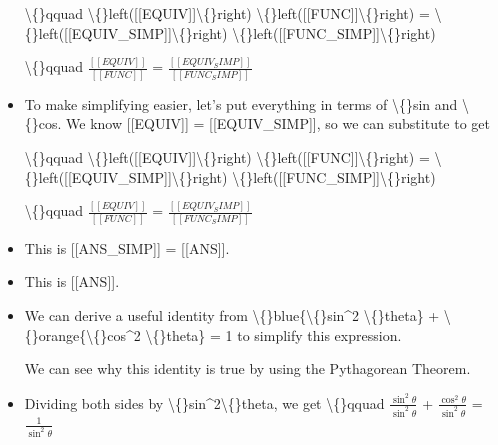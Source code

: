 \documentclass{article}
\begin{document}
\begin{itemize}
                        \textbackslash\{\}qquad 
                            \textbackslash\{\}left([[EQUIV]]\textbackslash\{\}right)
                            \textbackslash\{\}left([[FUNC]]\textbackslash\{\}right) 
                            =
                            \textbackslash\{\}left([[EQUIV\_SIMP]]\textbackslash\{\}right)
                            \textbackslash\{\}left([[FUNC\_SIMP]]\textbackslash\{\}right) 
                        
                    
                    
                        \textbackslash\{\}qquad
                            $\frac{[[EQUIV]]}{[[FUNC]]}$
                            =
                            $\frac{[[EQUIV_SIMP]]}{[[FUNC_SIMP]]}$
  \item To make simplifying easier, let's put everything
                    in terms of \textbackslash\{\}sin and \textbackslash\{\}cos.
                    We know [[EQUIV]] 
                        = [[EQUIV\_SIMP]], so we can substitute
                    to get
                    
                        \textbackslash\{\}qquad
                            \textbackslash\{\}left([[EQUIV]]\textbackslash\{\}right)
                            \textbackslash\{\}left([[FUNC]]\textbackslash\{\}right) 
                            =
                            \textbackslash\{\}left([[EQUIV\_SIMP]]\textbackslash\{\}right)
                            \textbackslash\{\}left([[FUNC\_SIMP]]\textbackslash\{\}right) 
                        
                    
                    
                        \textbackslash\{\}qquad
                            $\frac{[[EQUIV]]}{[[FUNC]]}$
                            =
                            $\frac{[[EQUIV_SIMP]]}{[[FUNC_SIMP]]}$
  \item This is [[ANS\_SIMP]] = [[ANS]].
  \item This is [[ANS]].
  \item We can derive a useful identity from 
                    \textbackslash\{\}blue\{\textbackslash\{\}sin\textasciicircum{}2 \textbackslash\{\}theta\} + \textbackslash\{\}orange\{\textbackslash\{\}cos\textasciicircum{}2 \textbackslash\{\}theta\}
                        = 1
                    to simplify this expression.
                    
                    We can see why this identity is true by using the 
                    Pythagorean Theorem.
  \item Dividing both sides by \textbackslash\{\}sin\textasciicircum{}2\textbackslash\{\}theta, we get
                    \textbackslash\{\}qquad $\frac{\sin^2\theta}{\sin^2\theta}$ 
                    + $\frac{\cos^2\theta}{\sin^2\theta}$ 
                    = $\frac{1}{\sin^2\theta}$
                    

\end{itemize}
\end{document}
